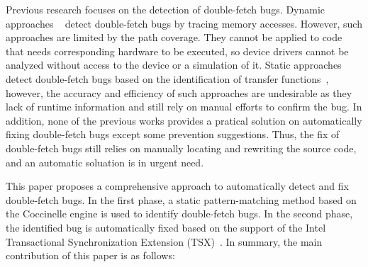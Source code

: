 \documentclass[10pt]{llncs}
\begin{document}
Previous research focuses on the detection of double-fetch bugs. Dynamic approaches
~\cite{bochspwn,jurczyk2013identifying,wilhelm15tracing} detect double-fetch bugs by tracing 
memory accesses. However, such approaches are limited by the path coverage. They cannot be 
applied to code that needs corresponding hardware to be executed, so device drivers cannot be 
analyzed without access to the device or a simulation of it. Static approaches detect double-fetch 
bugs based on the identification of transfer functions~\cite{wang, precise}, however, the accuracy 
and efficiency of such approaches are undesirable as they lack of runtime information and still 
rely on manual efforts to confirm the bug. 
In addition, none of the previous works provides a pratical solution on automatically fixing 
double-fetch bugs except some prevention suggestions. Thus, the fix of double-fetch bugs still relies
on manually locating and rewriting the source code, and an automatic soluation is in urgent need.




This paper proposes a comprehensive approach to automatically detect and fix double-fetch bugs. In the first phase, 
a static pattern-matching method based on the Coccinelle engine is used to identify double-fetch bugs.
In the second phase, the identified bug is automatically fixed based on the support of the Intel 
Transactional Synchronization Extension (TSX)~\cite{Yoo2014Performance}.%
In summary, the main contribution of this paper is as follows:
\end{document}
